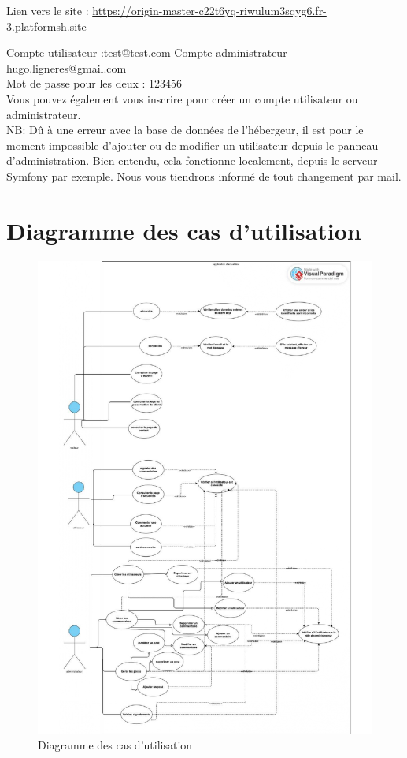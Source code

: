\documentclass[12pt,a4paper]{article}
\begin{document}
Lien vers le site : \url{https://origin-master-c22t6yq-riwulum3sqyg6.fr-3.platformsh.site}

Compte utilisateur :test@test.com
Compte administrateur hugo.ligneres@gmail.com \\

Mot de passe pour les deux : 123456 \\

Vous pouvez également vous inscrire pour créer un compte utilisateur ou administrateur. \\

NB: Dû à une erreur avec la base de données de l'hébergeur, il est pour le moment impossible d'ajouter ou de modifier un utilisateur depuis le panneau d'administration. Bien entendu, cela fonctionne localement, depuis le serveur Symfony par exemple. Nous vous tiendrons informé de tout changement par mail.


\section{Diagramme des cas d'utilisation}

\begin{figure}[!h]
	\begin{center}
		\includegraphics[scale=.65]{use_case.jpg}
		\caption{Diagramme des cas d'utilisation}
	\end{center}
\end{figure}	
\end{document}
